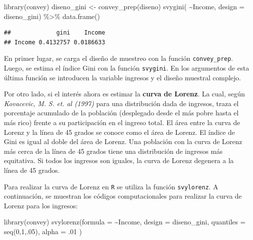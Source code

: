 \documentclass[
  12pt,
]{book}
\newenvironment{Shaded}{\begin{snugshade}}{\end{snugshade}}
\newcommand{\AttributeTok}[1]{\textcolor[rgb]{0.77,0.63,0.00}{#1}}
\newcommand{\DecValTok}[1]{\textcolor[rgb]{0.00,0.00,0.81}{#1}}
\newcommand{\FunctionTok}[1]{\textcolor[rgb]{0.00,0.00,0.00}{#1}}
\newcommand{\NormalTok}[1]{#1}
\newcommand{\OtherTok}[1]{\textcolor[rgb]{0.56,0.35,0.01}{#1}}
\newcommand{\SpecialCharTok}[1]{\textcolor[rgb]{0.00,0.00,0.00}{#1}}
\begin{document}
\begin{Shaded}
\begin{Highlighting}[]
\FunctionTok{library}\NormalTok{(convey)}
\NormalTok{ diseno\_gini }\OtherTok{\textless{}{-}} \FunctionTok{convey\_prep}\NormalTok{(diseno)}
\FunctionTok{svygini}\NormalTok{( }\SpecialCharTok{\textasciitilde{}}\NormalTok{Income, }\AttributeTok{design =}\NormalTok{ diseno\_gini) }\SpecialCharTok{\%\textgreater{}\%}
  \FunctionTok{data.frame}\NormalTok{()}
\end{Highlighting}
\end{Shaded}

\begin{verbatim}
##             gini    Income
## Income 0.4132757 0.0186633
\end{verbatim}

En primer lugar, se carga el diseño de muestreo con la función \texttt{convey\_prep}. Luego, se estima el índice Gini con la función \texttt{svygini}. En los argumentos de esta última función se introducen la variable ingresos y el diseño muestral complejo.

Por otro lado, si el interés ahora es estimar la \textbf{curva de Lorenz}. La cual, según \emph{Kovacevic, M. S. et. al (1997)} para una distribución dada de ingresos, traza el porcentaje acumulado de la población (desplegado desde el más pobre hasta el más rico) frente a su participación en el ingreso total. El área entre la curva de Lorenz y la línea de 45 grados se conoce como el área de Lorenz. El índice de Gini es igual al doble del área de Lorenz. Una población con la curva de Lorenz más cerca de la línea de 45 grados tiene una distribución de ingresos más equitativa. Si todos los ingresos son iguales, la curva de Lorenz degenera a la línea de 45 grados.

Para realizar la curva de Lorenz en \texttt{R} se utiliza la función \texttt{svylorenz}. A continuación, se muestran los códigos computacionales para realizar la curva de Lorenz para los ingresos:

\begin{Shaded}
\begin{Highlighting}[]
\FunctionTok{library}\NormalTok{(convey)}
\FunctionTok{svylorenz}\NormalTok{(}\AttributeTok{formula =} \SpecialCharTok{\textasciitilde{}}\NormalTok{Income, }
          \AttributeTok{design =}\NormalTok{ diseno\_gini, }
          \AttributeTok{quantiles =} \FunctionTok{seq}\NormalTok{(}\DecValTok{0}\NormalTok{,}\DecValTok{1}\NormalTok{,.}\DecValTok{05}\NormalTok{), }
          \AttributeTok{alpha =}\NormalTok{ .}\DecValTok{01}\NormalTok{ )}
\end{Highlighting}
\end{Shaded}
\end{document}
